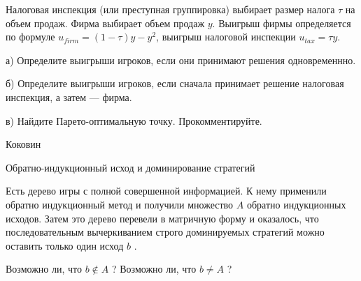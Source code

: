 \begin{problem}

Налоговая инспекция (или преступная группировка) выбирает размер
налога $\tau$ на объем продаж. Фирма выбирает объем продаж $y$.
Выигрыш фирмы определяется по формуле $u_{firm}=(1-\tau)y-y^{2}$,
выигрыш налоговой инспекции $u_{tax}=\tau y$. \par
а) Определите выигрыши игроков, если они принимают решения
одновременнно. \par
б) Определите выигрыши игроков, если сначала принимает решение
налоговая инспекция, а затем — фирма. \par
в) Найдите Парето-оптимальную точку. Прокомментируйте.



\begin{sol}

\end{sol}
\end{problem}


\begin{source}
Коковин
\end{source}



\begin{problem}
 Обратно-индукционный исход и доминирование стратегий\par
Есть дерево игры с полной совершенной информацией. К нему применили обратно индукционный метод и получили множество  $A$  обратно индукционных исходов. Затем это дерево перевели в матричную форму и оказалось, что последовательным вычеркиванием строго доминируемых стратегий можно оставить только один исход  $b$ .\par
Возможно ли, что  $b\notin A$ ? Возможно ли, что  $b\ne A$ ?\par



\begin{sol}

\end{sol}
\end{problem}




